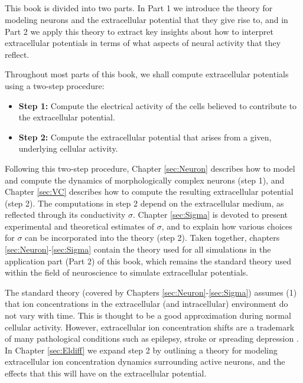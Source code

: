 \subsection{}
This book is divided into two parts. In Part 1 we introduce the theory for modeling neurons and the extracellular potential that they give rise to, and in Part 2 we apply this theory to extract key insights about how to interpret extracellular potentials in terms of what aspects of neural activity that they reflect.

Throughout most parts of this book, we shall compute extracellular potentials using a two-step procedure:  

\begin{itemize}
\item {\bf Step 1:} Compute the electrical activity of the cells believed to contribute to the extracellular potential. 
\item {\bf Step 2:} Compute the extracellular potential that arises from a given, underlying cellular activity.
\end{itemize}

Following this two-step procedure, Chapter \ref{sec:Neuron} describes how to model and compute the dynamics of morphologically complex neurons (step 1), and Chapter \ref{sec:VC} describes how to compute the resulting extracellular potential (step 2). The computations in step 2 depend on the extracellular medium, as reflected through its conductivity $\sigma$. Chapter \ref{sec:Sigma} is devoted to present experimental and theoretical estimates of $\sigma$, and to explain how various choices for $\sigma$ can be incorporated into the theory (step 2). Taken together, chapters \ref{sec:Neuron}-\ref{sec:Sigma} contain the theory used for all simulations in the application part (Part 2) of this book, which remains the standard theory used within the field of neuroscience to simulate extracellular potentials. 

The standard theory (covered by Chapters \ref{sec:Neuron}-\ref{sec:Sigma}) assumes (1) that ion concentrations in the extracellular (and intracellular) environment do not vary with time. This is thought to be a good approximation during normal cellular activity. However, extracellular ion concentration shifts are a trademark of many pathological conditions such as epilepsy, stroke or spreading depression \citep{Somjen2001, Frohlich2008, Zandt2015review, Ayata2015}. In Chapter \ref{sec:Eldiff} we expand step 2 by outlining a theory for modeling extracellular ion concentration dynamics surrounding active neurons, and the effects that this will have on the extracellular potential. 

